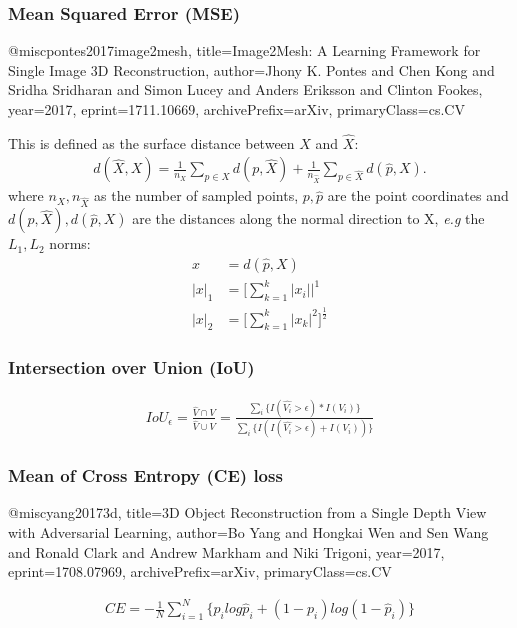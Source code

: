 


\subsubsection{Mean Squared Error (MSE)}

@misc{pontes2017image2mesh,
    title={Image2Mesh: A Learning Framework for Single Image 3D Reconstruction},
    author={Jhony K. Pontes and Chen Kong and Sridha Sridharan and Simon Lucey and Anders Eriksson and Clinton Fookes},
    year={2017},
    eprint={1711.10669},
    archivePrefix={arXiv},
    primaryClass={cs.CV}
}

This is defined as the surface distance between $X$ and $\hat{X}$:
\begin{align}
d(\hat{X},X) = \frac{1}{n_X} \sum_{p\in X}d(p,\hat{X})+\frac{1}{n_{\hat{X}}} \sum_{p\in \hat{X}}d(\hat{p},X).   
\end{align}
where ${n_X},n_{\hat{X}}$ as the number of sampled points, $p, \hat{p}$ are the point coordinates and $d(p,\hat{X}), d(\hat{p},X)$ are the distances along the normal direction to X, \textit{e.g} the $L_1, L_2$ norms:  
\begin{align}
x & = d(\hat{p},X) \\  
|x|_1 & = \Bigg[\sum_{k=1}^k|x_i|\Bigg|^1 \\  
|x|_2 & = \Bigg[\sum_{k=1}^k|x_k|^2\Bigg]^{\frac{1}{2}}  %
\end{align}

\subsubsection{Intersection over Union (IoU)}


\begin{align}
IoU_{\epsilon} = \frac{\hat{V} \cap V} {\hat{V} \cup V} = \frac{\sum_i\{I(\hat{V_i}> \epsilon) * I(V_i)\}}{\sum_i\{I(I(\hat{V_i}> \epsilon) + I(V_i))\}}    
\end{align}

\subsubsection{Mean of Cross Entropy (CE) loss}

@misc{yang20173d,
    title={3D Object Reconstruction from a Single Depth View with Adversarial Learning},
    author={Bo Yang and Hongkai Wen and Sen Wang and Ronald Clark and Andrew Markham and Niki Trigoni},
    year={2017},
    eprint={1708.07969},
    archivePrefix={arXiv},
    primaryClass={cs.CV}
}

\begin{align}
CE = -\frac{1}{N}\sum_{i=1}^N\{p_ilog\hat{p}_i+(1-p_i)log(1 - \hat{p}_i)\} 
\end{align}
